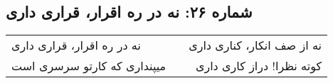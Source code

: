 \begin{center}
\section*{شماره ۲۶: نه در ره اقرار، قراری داری}
\label{sec:026}
\begin{longtable}{l p{0.5cm} r}
نه در ره اقرار، قراری داری
&&
نه از صف انکار، کناری داری
\\
میپنداری که کارتو سرسری است
&&
کوته نظرا! دراز کاری داری
\\
\end{longtable}
\end{center}
